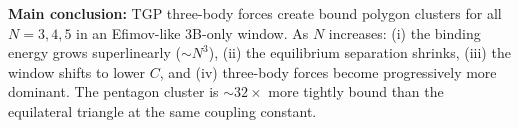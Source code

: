 \noindent
\textbf{Main conclusion:} TGP three-body forces create bound polygon
clusters for all $N=3,4,5$ in an Efimov-like 3B-only window.
As $N$ increases: (i) the binding energy grows superlinearly ($\sim N^3$),
(ii) the equilibrium separation shrinks, (iii) the window shifts to lower
$C$, and (iv) three-body forces become progressively more dominant.
The pentagon cluster is $\sim32\times$ more tightly bound than the
equilateral triangle at the same coupling constant.
